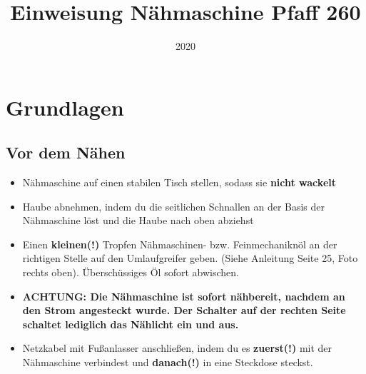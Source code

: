 \documentclass{\basedir/fablab-document}
\date{2020}
\author{}
\title{Einweisung Nähmaschine Pfaff 260}
\begin{document}
\maketitle

\section{Grundlagen}

\subsection{Vor dem Nähen}
\begin{itemize}
	\item Nähmaschine auf einen stabilen Tisch stellen, sodass sie \textbf{nicht wackelt}
	\item Haube abnehmen, indem du die seitlichen Schnallen an der Basis der Nähmaschine löst und die Haube nach oben abziehst
	\item Einen \textbf{kleinen(!)} Tropfen Nähmaschinen- bzw. Feinmechaniknöl an der richtigen Stelle auf den Umlaufgreifer geben. (Siehe Anleitung Seite 25, Foto rechts oben). Überschüssiges Öl sofort abwischen.
	\item \textbf{ACHTUNG: Die Nähmaschine ist sofort nähbereit, nachdem an den Strom angesteckt wurde. Der Schalter auf der rechten Seite schaltet lediglich das Nählicht ein und aus.}
	\item Netzkabel mit Fußanlasser anschließen, indem du es \textbf{zuerst(!)} mit der Nähmaschine verbindest und \textbf{danach(!)} in eine Steckdose steckst.
\end{itemize}
\end{document}
